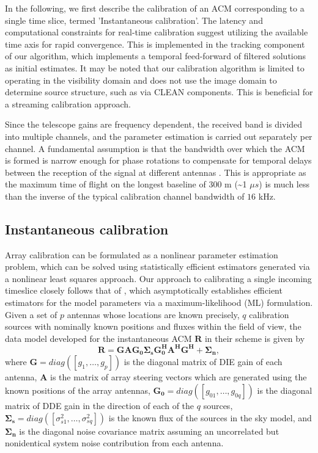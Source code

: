 \documentclass[referee]{aa}
\begin{document}
 In the  following,  we first  describe  the calibration  of an  ACM
corresponding to  a single  time slice, termed 'Instantaneous  calibration'.  The
latency  and   computational  constraints  for   real-time  calibration  suggest
utilizing the available time axis  for rapid convergence. This is implemented in
the  tracking   component  of  our   algorithm,  which  implements   a  temporal
feed-forward of filtered  solutions as initial estimates.  It  may be noted that
our calibration algorithm is limited  to operating in the visibility domain and
does not  use the image  domain to determine  source structure, such as  via CLEAN
components. This is beneficial for a streaming calibration approach.

Since  the telescope gains are frequency  dependent, the received band
is divided into  multiple channels, and the parameter  estimation is carried out
separately per  channel.  A  fundamental assumption is  that the  bandwidth over
which the ACM  is formed is narrow enough for phase  rotations to compensate for
temporal  delays between  the  reception  of the  signal  at different  antennas
\citep{zatman1998narrow}.  This is appropriate as  the maximum time of flight on
the longest baseline of 300 m  (\textasciitilde{}1 $\mu s$) is much less than
the  inverse of  the typical  calibration channel  bandwidth of  $16$  kHz.



\subsection{Instantaneous calibration}

Array  calibration  can  be  formulated  as a  nonlinear  parameter  estimation
problem, which can be  solved using statistically efficient estimators generated
via a  nonlinear least squares approach.  Our approach to  calibrating a single
incoming  timeslice closely  follows  that of  \citet{wijnholds2009multisource},
which asymptotically establishes efficient estimators for  the model parameters
via a  maximum-likelihood (ML)  formulation. Given a  set of $p$  antennas whose
locations are known  precisely,  $q$ calibration sources  with nominally known
positions and fluxes within the field  of view, the data model developed for the
instantaneous ACM $\mathbf{R}$ in their scheme is given by
\begin{equation}
\mathbf{R=GAG_{0}\Sigma_{s}G_{0}^{H}A^{H}G^{H}+\Sigma_{n},}\label{eq:datamodel}
\end{equation}
where    \textbf{$\mathbf{G=}diag(\left[g_{1},\ldots,g_{p}\right])$    }is   the
diagonal matrix of DIE gain of each antenna, $\mathbf{A}$ is the matrix of array
steering  vectors which are  generated using  the known  positions of  the array
antennas,    $\mathbf{G_{0}=}diag(\left[g_{01},\ldots,g_{0q}\right])$   is   the
diagonal  matrix of  DDE  gain in  the direction  of  each of  the $q$  sources,
$\mathbf{\Sigma_{s}}=diag\left(\left[\sigma_{s1}^{2},\ldots,\sigma_{sq}^{2}\right]\right)$
is the known flux of the  sources in the sky model, and $\mathbf{\Sigma_{n}}$ is
the diagonal noise covariance matrix assuming an uncorrelated but nonidentical
system noise contribution from each antenna.
\end{document}
